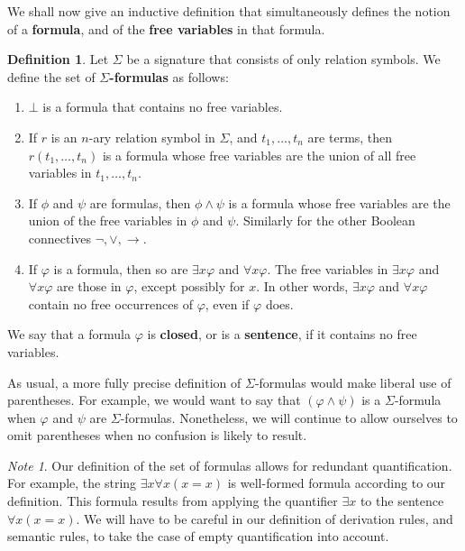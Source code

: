 \documentclass[11pt,fleqn]{article}
\theoremstyle{definition}
\newtheorem*{defn}{Definition}
\theoremstyle{remark}
\newtheorem*{note}{Note}
\newcommand{\2}{\mathscr}
\renewcommand{\emph}{\textbf}
\newcommand{\vp}{\varphi}
\begin{document}
We shall now give an inductive definition that simultaneously defines
the notion of a \textbf{formula}, and of the \textbf{free variables}
in that formula.

\begin{defn} Let $\Sigma$ be a signature that consists of only
  relation symbols.  We define the set of \textbf{$\Sigma$-formulas}
  as follows:
\begin{enumerate}
\item $\bot$ is a formula that contains no free variables.
\item If $r$ is an $n$-ary relation symbol in $\Sigma$, and
  $t_1,\dots ,t_n$ are terms, then $r(t_1,\dots ,t_n)$ is a formula
  whose free variables are the union of all free variables in
  $t_1,\dots ,t_n$.
\item If $\phi$ and $\psi$ are formulas, then $\phi\wedge \psi$ is a
  formula whose free variables are the union of the free variables in
  $\phi$ and $\psi$.  Similarly for the other Boolean connectives
  $\neg ,\vee,\to$.
\item If $\vp$ is a formula, then so are $\exists x\vp$ and
  $\forall x\vp$.  The free variables in $\exists x\vp$ and
  $\forall x\vp$ are those in $\vp$, except possibly for $x$.  In
  other words, $\exists x\vp$ and $\forall x\vp$ contain no free
  occurrences of $\vp$, even if $\vp$ does.  \end{enumerate} We say
that a formula $\vp$ is \emph{closed}, or is a \emph{sentence}, if it
contains no free variables.  \end{defn}

As usual, a more fully precise definition of $\Sigma$-formulas would
make liberal use of parentheses.  For example, we would want to say
that $(\vp\wedge \psi )$ is a $\Sigma$-formula when $\vp$ and $\psi$
are $\Sigma$-formulas.  Nonetheless, we will continue to allow
ourselves to omit parentheses when no confusion is likely to result.

\begin{note} Our definition of the set of formulas allows for
  redundant quantification.  For example, the string
  $\exists x\forall x(x=x)$ is well-formed formula according to our
  definition.  This formula results from applying the quantifier
  $\exists x$ to the sentence $\forall x(x=x)$.  We will have to be
  careful in our definition of derivation rules, and semantic rules,
  to take the case of empty quantification into account.
\end{note}

\end{document}
